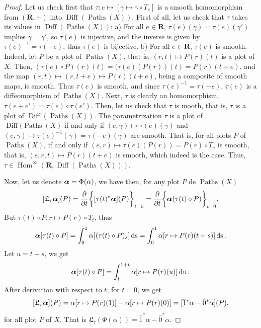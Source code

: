 \documentclass[11pt,reqno]{amsart}
\theoremstyle{definition}
\renewcommand{\over}{\above .2pt}
\newcommand{\RR}{{\mathbf R}}
\newcommand{\balpha}{\mbox{\boldmath $\alpha$}}
\def \P{{P}}
\def \T{{T}}
\def \X{{X}}
\newcommand{\fL}{{\mathfrak  L}}
\newcommand{\Paths}{\operatorname{Paths}}
\newcommand{\source}{\hat 0}
\newcommand{\but}{\hat 1}
\newcommand{\Diff}{\operatorname{Diff}}
\newcommand{\DHom}{{\operatorname{Hom}}^\infty}
\newcommand{\DLie}{{\fL}}
\newcommand{\ds}{\operatorname{ds}}
\newcommand{\du}{\operatorname{du}}
\begin{document}
  \begin{proof} Let us check first that $\tau : e \mapsto
    [\gamma \mapsto \gamma \circ \T_e]$ is a smooth
    homomorphism from $(\RR,+)$ into $\Diff(\Paths(\X))$.
    First of all, let us check that $\tau$
    takes its values in $\Diff(\Paths(\X))$: a) For all $e \in
      \RR$, $\tau(e)(\gamma) = \tau(e)(\gamma')$ implies
    $\gamma = \gamma'$, so $\tau(e)$ is injective, and the
    inverse is given by $\tau(e)^{-1} = \tau(-e)$, thus
    $\tau(e)$ is bijective. b) For all $e \in \RR$, $\tau(e)$
    is smooth. Indeed, let $\P$ be a plot of $\Paths(\X)$, that is,
    $(r,t) \mapsto \P(r)(t)$ is a plot of $\X$. Then, 
    $(\tau(e) \circ \P)(r)(t) = (\tau(e)(P(r))(t) = \P(r)(t+e)$, and
    the map $(r,t) \mapsto (r,t+e) \mapsto \P(r)(t+e)$, being a composite of smooth maps, is smooth.
    Thus $\tau(e)$ is smooth, and since $\tau(e)^{-1} = \tau(-e)$, $\tau(e)$ is
    a diffeomorphism of $\Paths(\X)$.
    Next, $\tau$ is clearly an homomorphism, $\tau(e+e') =
      \tau(e) \circ \tau(e')$. Then, let us check that $\tau$ is mooth, that is, $\tau$ is a plot of 
      $\Diff(\Paths(\X))$. The parametrization $\tau$ is a plot of $\Diff(\Paths(\X)$ if and only if
      $(e,\gamma) \mapsto \tau(e)(\gamma)$ and $(e,\gamma) \mapsto \tau(e)^{-1}(\gamma) = \tau(-e)(\gamma)$
       are smooth. That is, for all plots $\P$ of $\Paths(\X)$, if and only if 
       $(e,r) \mapsto \tau(e)(\P(r)) = \P(r)\circ T_e$ is smooth, that is,
       $(e,r,t) \mapsto \P(r)(t+e)$ is smooth,
       which indeed is the case. Thus, $\tau \in \DHom(\RR,\Diff(\Paths(\X)))$.
    
    Now, let us denote $\balpha = \Phi(\alpha)$, we have then, for any plot
    $\P$ de $\Paths(\X)$  
    $$[\DLie_\tau\balpha](\P) = {\partial \over \partial
      t}\bigg\{[\tau(t)^*\balpha](\P)\bigg\}_{t = 0} =
      {\partial \over \partial
      t}\bigg\{\balpha(\tau(t) \circ \P) \bigg\}_{t = 0}.
      $$
    But $\tau(t) \circ \P: r \mapsto \P(r) \circ
      {\T}_t$, thus 
    $$ \balpha [\tau(t) \circ \P] = \int_0^1
      \alpha[(\tau(t) \circ \P)_s] \ds =
      \int_0^1 \alpha[r \mapsto \P(r)(t+s)] \ds.
      $$ 
    Let $u = t+s$, we get 
    $$ 
      \balpha[\tau(t) \circ \P] = \int_t^{1+t} \alpha[r
      \mapsto  \P(r)(u)] \du.
      $$
    After derivation with respect to $t$, for $t = 0$, we get 
    $$[\DLie_\tau\balpha](\P) = \alpha[r \mapsto
      \P(r)(1)] - \alpha[r \mapsto 
      \P(r)(0)] =
      [\but^*\alpha-\source^*\alpha](\P),
      $$ 
     for all plot $\P$ of $\X$. That is $\DLie_\tau (\Phi(\alpha)) = \but^*\alpha
      -\source^*\alpha$. 
  \end{proof}
  
\end{document}
